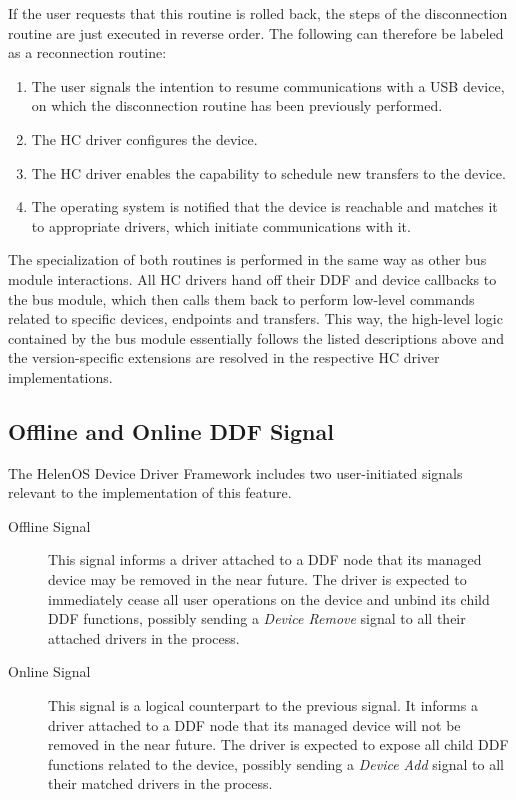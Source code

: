 If the user requests that this routine is rolled back, the steps of the
disconnection routine are just executed in reverse order. The following can
therefore be labeled as a reconnection routine:
%
\begin{enumerate}
	\item The user signals the intention to resume communications with a USB
	device, on which the disconnection routine has been previously performed.
	\item The HC driver configures the device.
	\item The HC driver enables the capability to schedule new transfers to the
	device.
	\item The operating system is notified that the device is reachable and
	matches it to appropriate drivers, which initiate communications with it.
\end{enumerate}

The specialization of both routines is performed in the same way as other bus
module interactions. All HC drivers hand off their DDF and device callbacks to
the bus module, which then calls them back to perform low-level commands related
to specific devices, endpoints and transfers. This way, the high-level logic
contained by the bus module essentially follows the listed descriptions above
and the version-specific extensions are resolved in the respective HC driver
implementations.


\subsection{Offline and Online DDF Signal}
\label{sec:offline-online}

The HelenOS Device Driver Framework includes two user-initiated signals
relevant to the implementation of this feature.

\begin{description}
	\item[Offline Signal]
		This signal informs a driver attached to a DDF node that its managed
		device may be removed in the near future. The driver is expected to
		immediately cease all user operations on the device and unbind its
		child DDF functions, possibly sending a \textit{Device Remove} signal
		to all their attached drivers in the process.

	\item[Online Signal]
		This signal is a logical counterpart to the previous signal.
		It informs a driver attached to a DDF node that its managed device will
		not be removed in the near future. The driver is expected to expose all
		child DDF functions related to the device, possibly sending a
		\textit{Device Add} signal to all their matched drivers in the process.
\end{description}

